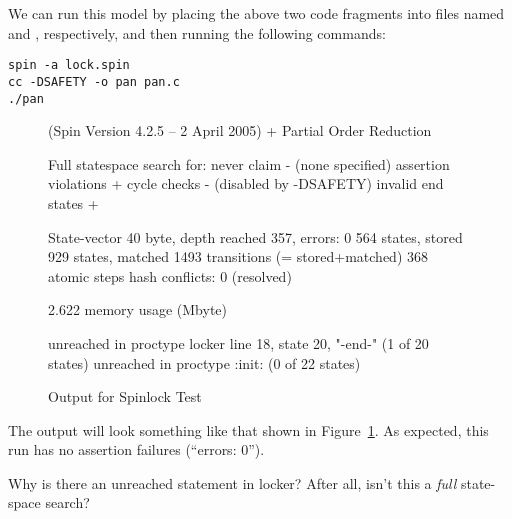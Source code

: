 We can run this model by placing the above two code fragments into
files named  and , respectively, and then running
the following commands:

\vspace{5pt}
\begin{minipage}[t]{\columnwidth}
\scriptsize
\begin{verbatim}
spin -a lock.spin
cc -DSAFETY -o pan pan.c
./pan
\end{verbatim}
\end{minipage}
\vspace{5pt}

\begin{figure}[htbp]
{ \scriptsize
\begin{verbbox}
(Spin Version 4.2.5 -- 2 April 2005)
        + Partial Order Reduction

Full statespace search for:
        never claim             - (none specified)
        assertion violations    +
        cycle checks            - (disabled by -DSAFETY)
        invalid end states      +

State-vector 40 byte, depth reached 357, errors: 0
     564 states, stored
     929 states, matched
    1493 transitions (= stored+matched)
     368 atomic steps
hash conflicts: 0 (resolved)

2.622   memory usage (Mbyte)

unreached in proctype locker
        line 18, state 20, "-end-"
        (1 of 20 states)
unreached in proctype :init:
        (0 of 22 states)
\end{verbbox}
}
\centering
\theverbbox
\caption{Output for Spinlock Test}
\label{fig:analysis:Output for Spinlock Test}
\end{figure}

The output will look something like that shown in
Figure~\ref{fig:analysis:Output for Spinlock Test}.
As expected, this run has no assertion failures (``errors: 0'').

\QuickQuiz{}
	Why is there an unreached statement in
	locker?  After all, isn't this a \emph{full} state-space
	search?
 \QuickQuizEnd

